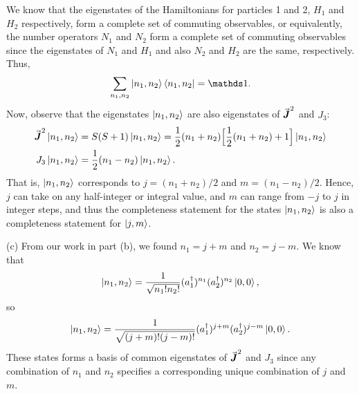 {We know that the eigenstates of the Hamiltonians for particles 1 and 2, $H_1$ and $H_2$ respectively, form a complete set of commuting observables, or equivalently, the number operators $N_1$ and $N_2$ form a complete set of commuting observables since the eigenstates of $N_1$ and $H_1$ and also $N_2$ and $H_2$ are the same, respectively.
Thus,
\begin{eqnarray}
    \sum_{n_1,n_2} \ket{n_1,n_2} \bra{n_1,n_2} = \id
.\end{eqnarray}
Now, observe that the eigenstates $\ket{n_1,n_2}$ are also eigenstates of $\va*{J}^2$ and $J_3$:
\begin{eqnarray}
\begin{aligned}
    \va*{J}^2\ket{n_1,n_2} &= S(S + 1) \ket{n_1,n_2} = \frac{1}{2}(n_1 + n_2) \Big[ \frac{1}{2}(n_1 + n_2) + 1 \Big] \ket{n_1,n_2} \\
    J_3 \ket{n_1,n_2} &= \frac{1}{2} (n_1 - n_2) \ket{ n_1,n_2}
.\end{aligned}
\end{eqnarray}
That is, $\ket{n_1,n_2}$ corresponds to $j = (n_1+n_2)/2$ and $m = (n_1-n_2)/2$.
Hence, $j$ can take on any half-integer or integral value, and $m$ can range from $-j$ to $j$ in integer steps, and thus the completeness statement for the states $\ket{n_1,n_2}$ is also a completeness statement for $\ket{j,m}$.

(c) From our work in part (b), we found $n_1 = j+m$ and $n_2 = j-m$.
We know that
\begin{eqnarray}
    \ket{n_1,n_2} = \frac{1}{\sqrt{n_1! n_2!}} (a_1^{\dagger})^{n_1} (a_2^{\dagger})^{n_2} \ket{0,0}
,\end{eqnarray}
so
\begin{eqnarray}
    \ket{n_1,n_2} = \frac{1}{\sqrt{(j+m)!(j-m)!}} (a_1^{\dagger})^{j+m} (a_2^{\dagger})^{j-m} \ket{0,0}
.\end{eqnarray}
These states forms a basis of common eigenstates of $\va*{J}^2$ and $J_3$ since any combination of $n_1$ and $n_2$ specifies a corresponding unique combination of $j$ and $m$.

}






